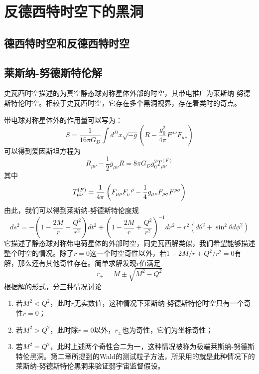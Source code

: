 \chapter{反德西特时空下的黑洞}
\section{德西特时空和反德西特时空}
\section{莱斯纳-努德斯特伦解}
史瓦西时空描述的为真空静态球对称星体外部的时空，其带电推广为莱斯纳-努德斯特伦时空。相较于史瓦西时空，它存在多个黑洞视界，存在着类时的奇点。

带电球对称星体外的作用量可以写为：
\begin{equation}
    S=\frac{1}{16 \pi G_D}\int d^D x \sqrt{-g}\left(R-\frac{g_{0}^2}{4 \pi}F^{\mu \nu}F_{\mu \nu}\right)
\end{equation}
可以得到爱因斯坦方程为
\begin{equation}
    R_{\mu \nu}-\frac{1}{2}g_{\mu \nu}R=8\pi G_D g_0^2 T^{\left(F\right)}_{\mu \nu}
\end{equation}
其中
\begin{equation}
    T^{\left(F\right)}_{\mu \nu}=\frac{1}{4\pi}\left(F_{\mu \rho }F\indices{_{\nu}^{\rho}}-\frac{1}{4}g_{\mu \nu}F_{\rho \sigma}F^{\rho \sigma} \right)
\end{equation}
由此，我们可以得到莱斯纳-努德斯特伦度规\citep{陈斌2018广义相对论}
\begin{equation}\label{eq: RNmetric}
     ds^2=-\left(1-\frac{2M}{r}+\frac{Q^2}{r^2}\right)dt^2+\left(1-\frac{2M}{r}+\frac{Q^2}{r^2}\right)^{-1}dr^2+r^2\left(d\theta^2+\sin ^2 \theta d\phi^2\right)
\end{equation}
它描述了静态球对称带电荷星体的外部时空，同史瓦西解类似，我们希望能够描述整个时空的情况。除了$r=0$这一个时空奇性以外，若$1-2M / r+Q^2 / r^2=0$有解，那么还有其他奇性存在。简单求解发现$r$值满足
\begin{equation}\label{eq: RNhorizon}
    r_{\pm}=M \pm \sqrt{M^2-Q^2}
\end{equation}
根据解的形式，分三种情况讨论
\begin{enumerate}
    \item 若$M^2<Q^2$，此时$r$无实数值，这种情况下莱斯纳-努德斯特伦时空只有一个奇性$r=0$；
    \item 若$M^2>Q^2$，此时除$r=0$以外，$r_{\pm}$也为奇性，它们为坐标奇性\citep{梁灿彬2006微分几何入门与广义相对论}；
    \item 若$M^2=Q^2$，此时上述两个奇性合二为一，这种情况被称为极端莱斯纳-努德斯特伦黑洞。第二章所提到的Wald的测试粒子方法\citep{wald1974gedanken}，所采用的就是此种情况下的莱斯纳-努德斯特伦黑洞来验证弱宇宙监督假设。
\end{enumerate}